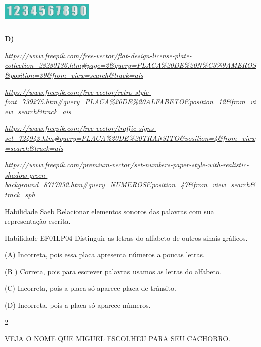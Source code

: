 \begin{escola}
\includegraphics[width=1.75000in,height=0.54792in]{media/image225.jpg}

\textbf{D)}

\href{https://www.freepik.com/free-vector/flat-design-license-plate-collection_28280136.htm\#page=2\&query=PLACA\%20DE\%20N\%C3\%9AMEROS\&position=39\&from_view=search\&track=ais}{\emph{https://www.freepik.com/free-vector/flat-design-license-plate-collection\_28280136.htm\#page=2\&query=PLACA\%20DE\%20N\%C3\%9AMEROS\&position=39\&from\_view=search\&track=ais}}

\href{https://www.freepik.com/free-vector/retro-style-font_739275.htm\#query=PLACA\%20DE\%20ALFABETO\&position=12\&from_view=search\&track=ais}{\emph{https://www.freepik.com/free-vector/retro-style-font\_739275.htm\#query=PLACA\%20DE\%20ALFABETO\&position=12\&from\_view=search\&track=ais}}

\href{https://www.freepik.com/free-vector/traffic-signs-set_724943.htm\#query=PLACA\%20DE\%20TRANSITO\&position=4\&from_view=search\&track=ais}{\emph{https://www.freepik.com/free-vector/traffic-signs-set\_724943.htm\#query=PLACA\%20DE\%20TRANSITO\&position=4\&from\_view=search\&track=ais}}

\href{https://www.freepik.com/premium-vector/set-numbers-paper-style-with-realistic-shadow-green-background_8717932.htm\#query=NUMEROS\&position=47\&from_view=search\&track=sph}{\emph{https://www.freepik.com/premium-vector/set-numbers-paper-style-with-realistic-shadow-green-background\_8717932.htm\#query=NUMEROS\&position=47\&from\_view=search\&track=sph}}

Habilidade Saeb Relacionar elementos sonoros das palavras com sua
representação escrita.

Habilidade EF01LP04 Distinguir as letras do alfabeto de outros sinais
gráficos.

(A) Incorreta, pois essa placa apresenta números a poucas letras.

(B ) Correta, pois para escrever palavras usamos as letras do alfabeto.

(C) Incorreta, pois a placa só aparece placa de trânsito.

(D) Incorreta, pois a placa só aparece
números.\protect\hypertarget{_heading=h.vsxh2fkjtnnn}{}{}

\num{2}

VEJA O NOME QUE MIGUEL ESCOLHEU PARA SEU CACHORRO.


\end{escola}
